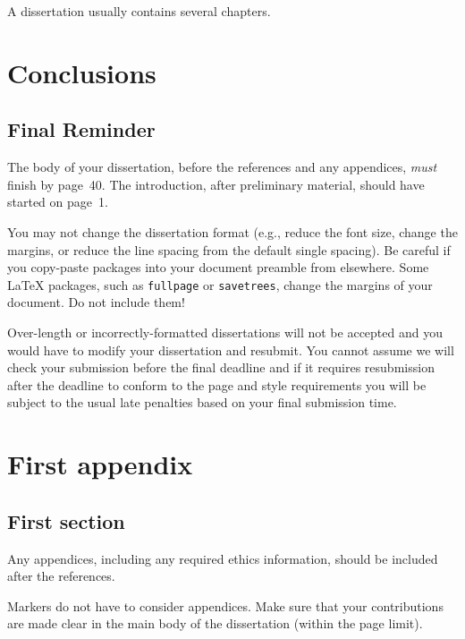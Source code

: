 \documentclass[logo,bsc,singlespacing,parskip]{infthesis}
\begin{document}
A dissertation usually contains several chapters.

\chapter{Conclusions}

\section{Final Reminder}

The body of your dissertation, before the references and any appendices,
\emph{must} finish by page~40. The introduction, after preliminary material,
should have started on page~1.

You may not change the dissertation format (e.g., reduce the font size, change
the margins, or reduce the line spacing from the default single spacing). Be
careful if you copy-paste packages into your document preamble from elsewhere.
Some \LaTeX{} packages, such as \texttt{fullpage} or \texttt{savetrees}, change
the margins of your document. Do not include them!

Over-length or incorrectly-formatted dissertations will not be accepted and you
would have to modify your dissertation and resubmit. You cannot assume we will
check your submission before the final deadline and if it requires resubmission
after the deadline to conform to the page and style requirements you will be
subject to the usual late penalties based on your final submission time.

% 




\appendix

\chapter{First appendix}

\section{First section}

Any appendices, including any required ethics information, should be included
after the references.

Markers do not have to consider appendices. Make sure that your contributions
are made clear in the main body of the dissertation (within the page limit).
\end{document}
